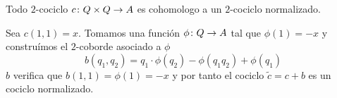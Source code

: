 \begin{proposicion}\label{prop:normcoc}
	Todo $2$-cociclo $c\colon Q\times Q\to A$ es cohomologo a un $2$-cociclo normalizado. %
	\begin{demostracion}
		Sea $c(1,1) = x$. Tomamos una función $\phi\colon Q\to A$ tal que $\phi(1) = -x$ y construímos el $2$-coborde asociado a $\phi$
		\begin{equation*}
			b(q_1,q_2) = q_1\cdot \phi(q_2) - \phi(q_1q_2) + \phi(q_1)
		\end{equation*}
		$b$ verifica que $b(1,1) = \phi(1) = -x$ y por tanto el cociclo $\tilde c = c+b$ es un cociclo normalizado.
	\end{demostracion}
\end{proposicion}



